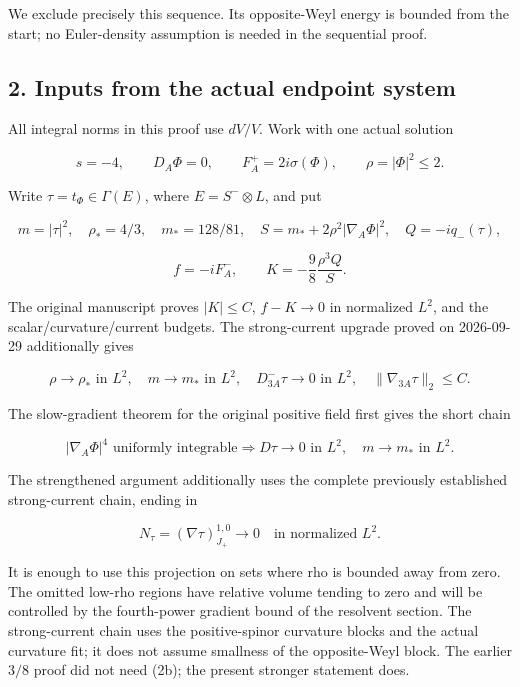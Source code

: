 We exclude precisely this sequence. Its opposite-Weyl energy is bounded
from the start; no Euler-density assumption is needed in the sequential
proof.

\hypertarget{o10strength:inputs-from-the-actual-endpoint-system}{%
\subsection{2. Inputs from the actual endpoint
system}\label{o10strength:inputs-from-the-actual-endpoint-system}}

All integral norms in this proof use \(dV/V\). Work with one actual
solution

\[
 s=-4,\qquad D_A\Phi=0,\qquad F_A^+=2i\sigma(\Phi),
 \qquad \rho=|\Phi|^2\le2.
\]

Write \(\tau=t_\Phi\in\Gamma(E)\), where \(E=S^-\otimes L\), and put

\[
 m=|\tau|^2,\quad \rho_*=4/3,\quad m_*=128/81,
 \quad S=m_*+2\rho^2|\nabla_A\Phi|^2,
 \quad Q=-iq_-(\tau),
\]

\[
 f=-iF_A^-,\qquad K=-\frac98\frac{\rho^3Q}{S}.
\]

The original manuscript proves \(|K|\le C\), \(f-K\to0\) in normalized
\(L^2\), and the scalar/curvature/current budgets. The strong-current
upgrade proved on 2026-09-29 additionally gives

\[
 \rho\to\rho_*\text{ in }L^2,\quad
 m\to m_*\text{ in }L^2,\quad
 D^-_{3A}\tau\to0\text{ in }L^2,\quad
 \|\nabla_{3A}\tau\|_2\le C.
\tag{2}
\]

The slow-gradient theorem for the original positive field first gives
the short chain

\[
 |\nabla_A\Phi|^4\text{ uniformly integrable}
 \Longrightarrow D\tau\to0\text{ in }L^2,\quad m\to m_*\text{ in }L^2.
\]

The strengthened argument additionally uses the complete previously
established strong-current chain, ending in

\[
 N_\tau=(\nabla\tau)^{1,0}_{J_+}\longrightarrow0
 \quad\text{in normalized }L^2.
\tag{2b}
\]

It is enough to use this projection on sets where rho is bounded away
from zero. The omitted low-rho regions have relative volume tending to
zero and will be controlled by the fourth-power gradient bound of the
resolvent section. The strong-current chain uses the positive-spinor
curvature blocks and the actual curvature fit; it does not assume
smallness of the opposite-Weyl block. The earlier \(3/8\) proof did not
need (2b); the present stronger statement does.

